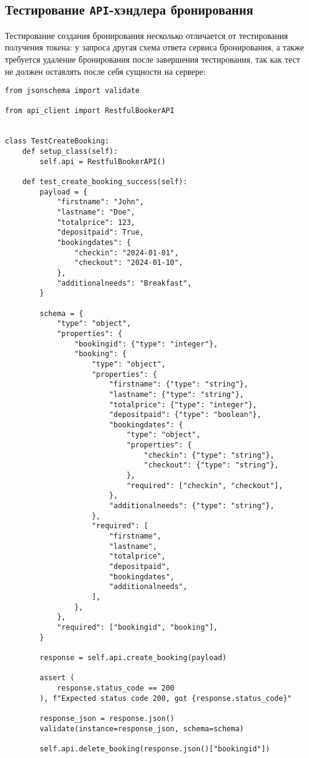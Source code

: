 \documentclass[a4paper]{article}
\begin{document}
    \subsection{Тестирование \texttt{API}-хэндлера бронирования}

    Тестирование создания бронирования несколько отличается от тестирования получения токена:
    у запроса другая схема ответа сервиса бронирования, а также требуется удаление бронирования
    после завершения тестирования, так как тест не должен оставлять после себя сущности на сервере:

    \begin{verbatim}
from jsonschema import validate

from api_client import RestfulBookerAPI


class TestCreateBooking:
    def setup_class(self):
        self.api = RestfulBookerAPI()

    def test_create_booking_success(self):
        payload = {
            "firstname": "John",
            "lastname": "Doe",
            "totalprice": 123,
            "depositpaid": True,
            "bookingdates": {
                "checkin": "2024-01-01",
                "checkout": "2024-01-10",
            },
            "additionalneeds": "Breakfast",
        }

        schema = {
            "type": "object",
            "properties": {
                "bookingid": {"type": "integer"},
                "booking": {
                    "type": "object",
                    "properties": {
                        "firstname": {"type": "string"},
                        "lastname": {"type": "string"},
                        "totalprice": {"type": "integer"},
                        "depositpaid": {"type": "boolean"},
                        "bookingdates": {
                            "type": "object",
                            "properties": {
                                "checkin": {"type": "string"},
                                "checkout": {"type": "string"},
                            },
                            "required": ["checkin", "checkout"],
                        },
                        "additionalneeds": {"type": "string"},
                    },
                    "required": [
                        "firstname",
                        "lastname",
                        "totalprice",
                        "depositpaid",
                        "bookingdates",
                        "additionalneeds",
                    ],
                },
            },
            "required": ["bookingid", "booking"],
        }

        response = self.api.create_booking(payload)

        assert (
            response.status_code == 200
        ), f"Expected status code 200, got {response.status_code}"

        response_json = response.json()
        validate(instance=response_json, schema=schema)

        self.api.delete_booking(response.json()["bookingid"])
    \end{verbatim}
\end{document}
